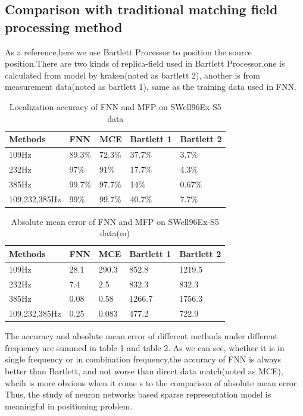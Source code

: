 \subsection{Comparison with traditional matching field processing method}
As a reference,here we use Bartlett Processor to position the source position.There are two kinds of replica-field used in Bartlett Processor,one is calculated from model by kraken(noted as bartlett 2), another is from measurement data(noted as bartlett 1), same as the training data used in FNN.
\begin{table}[]
\caption{Localization accuracy of FNN and MFP on SWell96Ex-S5 data}
\label{my-label}
\begin{tabular}{@{}lllll@{}}
\toprule
Methods       & FNN    & MCE    & Bartlett 1 & Bartlett 2 \\ \midrule
109Hz         & 89.3\% & 72.3\% & 37.7\%     & 3.7\%      \\
232Hz         & 97\%   & 91\%   & 17.7\%     & 4.3\%      \\
385Hz         & 99.7\% & 97.7\% & 14\%       & 0.67\%     \\
109,232,385Hz & 99\%   & 99.7\% & 40.7\%     & 7.7\%      \\ \bottomrule
\end{tabular}
\end{table}

\begin{table}[]
\caption{Absolute mean error of FNN and MFP on SWell96Ex-S5 data(m)}
\label{my-label}
\begin{tabular}{@{}lllll@{}}
\toprule
Methods       & FNN  & MCE   & Bartlett 1 & Bartlett 2 \\ \midrule
109Hz         & 28.1 & 290.3 & 852.8      & 1219.5     \\
232Hz         & 7.4  & 2.5   & 832.3      & 832.3      \\
385Hz         & 0.08 & 0.58  & 1266.7     & 1756.3     \\
109,232,385Hz & 0.25 & 0.083 & 477.2      & 722.9      \\ \bottomrule
\end{tabular}
\end{table}

The accuracy and absolute mean error of different methods under different frequency are summed in table 1 and table 2. As we can see, whether it is in single frequency or in combination frequency,the accuracy of FNN is always better than Bartlett, and not worse than direct data match(noted as MCE), whcih is more obvious when it come s to the comparison of absolute mean error. Thus, the study of neuron networks based sparse representation model is meaningful in positioning problem. 

